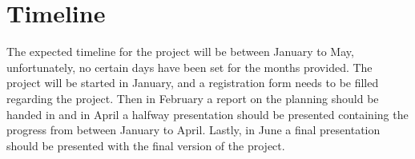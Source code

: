 \section{Timeline}
The expected timeline for the project will be between January to May, unfortunately, no certain days have been set for the months provided. The project will be started in January, and a registration form needs to be filled regarding the project. Then in February a report on the planning should be handed in and in April a halfway presentation should be presented containing the progress from between January to April. Lastly, in June a final presentation should be presented with the final version of the project.